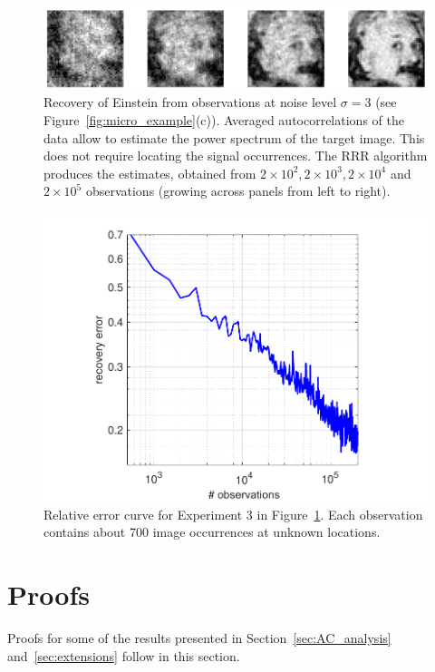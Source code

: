\documentclass[12pt]{article}
\newcommand{\1}{\mathbf{1}}
\theoremstyle{plain}
\theoremstyle{definition}
\theoremstyle{remark}
\theoremstyle{plain}
\theoremstyle{remark}
\theoremstyle{plain}
\theoremstyle{plain}
\theoremstyle{plain}
\numberwithin{equation}{section}
\begin{document}
\begin{figure}[t]
	\centering
	\includegraphics[width=1\linewidth]{Einstien_progress_examples}
	\caption{\label{fig:Einst_example} Recovery of Einstein from observations at noise level $\sigma = 3$ (see Figure~\ref{fig:micro_example}(c)). Averaged autocorrelations of the data allow to estimate the power spectrum of the target image. This does not require locating the signal occurrences. The RRR algorithm produces the estimates,  obtained from $2\times 10^2,2\times 10^3,2\times 10^4$ and $2\times 10^5$ observations (growing across panels from left to right).}	
\end{figure}


\begin{figure}[h]
	\centering
	\includegraphics[width=.8\linewidth]{Einstein_recovery_error}
	\caption{\label{fig:error_per_micro}Relative error curve for Experiment 3 in Figure~\ref{fig:Einst_example}. Each observation contains about 700 image occurrences at unknown locations.}
\end{figure}

\section{Proofs}

Proofs for some of the results presented in Section~\ref{sec:AC_analysis} and~\ref{sec:extensions} follow in this section.
\end{document}
